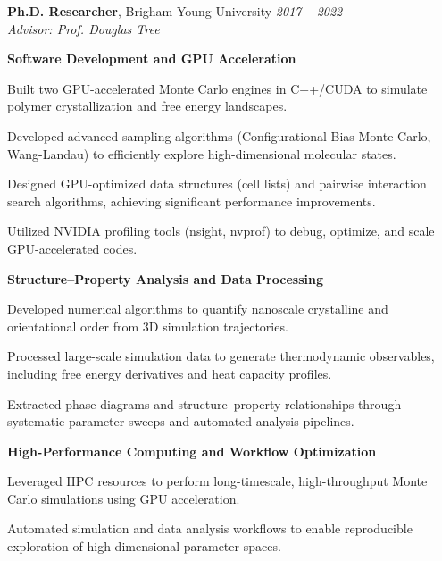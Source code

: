 \documentclass[letterpaper,12pt]{article}
\begin{document}
\textbf{Ph.D. Researcher}, Brigham Young University \hfill \textit{2017 – 2022} \\
\textit{Advisor: Prof. Douglas Tree}

\vspace{0.5em}
\textbf{Software Development and GPU Acceleration}
\begin{tabitemize}
    \item Built two GPU-accelerated Monte Carlo engines in C++/CUDA to simulate polymer crystallization and free energy landscapes.
    \item Developed advanced sampling algorithms (Configurational Bias Monte Carlo, Wang-Landau) to efficiently explore high-dimensional molecular states.
    \item Designed GPU-optimized data structures (cell lists) and pairwise interaction search algorithms, achieving significant performance improvements.
    \item Utilized NVIDIA profiling tools (nsight, nvprof) to debug, optimize, and scale GPU-accelerated codes.
\end{tabitemize}

\vspace{0.5em}
\textbf{Structure–Property Analysis and Data Processing}
\begin{tabitemize}
    \item Developed numerical algorithms to quantify nanoscale crystalline and orientational order from 3D simulation trajectories.
    \item Processed large-scale simulation data to generate thermodynamic observables, including free energy derivatives and heat capacity profiles.
    \item Extracted phase diagrams and structure–property relationships through systematic parameter sweeps and automated analysis pipelines.
\end{tabitemize}

\vspace{0.5em}
\textbf{High-Performance Computing and Workflow Optimization}
\begin{tabitemize}
    \item Leveraged HPC resources to perform long-timescale, high-throughput Monte Carlo simulations using GPU acceleration.
    \item Automated simulation and data analysis workflows to enable reproducible exploration of high-dimensional parameter spaces.
\end{tabitemize}
\end{document}
